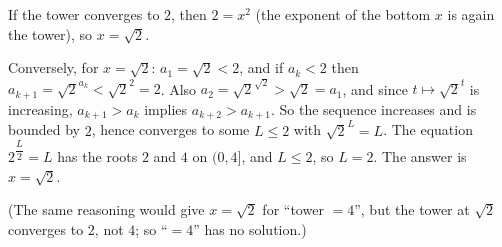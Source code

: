 If the tower converges to $2$, then $2=x^2$ (the exponent of the bottom $x$ is again the tower), so $x=\sqrt2$.

Conversely, for $x=\sqrt2$: $a_1=\sqrt2<2$, and if $a_k<2$ then $a_{k+1}=\sqrt2^{a_k}<\sqrt2^2=2$. Also $a_2=\sqrt2^{\sqrt2}>\sqrt2=a_1$, and since $t\mapsto\sqrt2^t$ is increasing, $a_{k+1}>a_k$ implies $a_{k+2}>a_{k+1}$. So the sequence increases and is bounded by $2$, hence converges to some $L\le2$ with $\sqrt2^L=L$. The equation $2^{\dfrac L2}=L$ has the roots $2$ and $4$ on $(0,4]$, and $L\le2$, so $L=2$. The answer is $\boxed{x=\sqrt2}$.

(The same reasoning would give $x=\sqrt2$ for ``tower $=4$'', but the tower at $\sqrt2$ converges to $2$, not $4$; so ``$=4$'' has no solution.)
